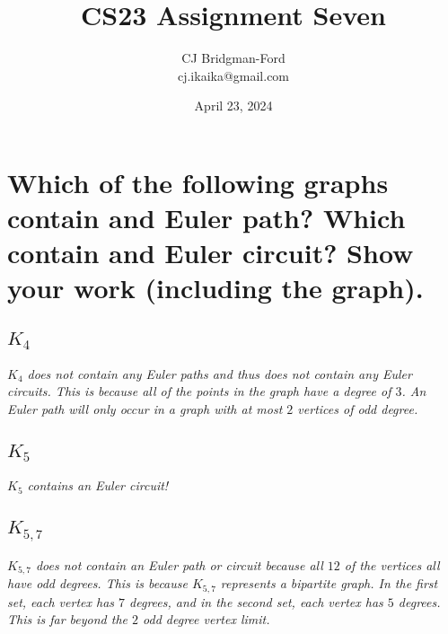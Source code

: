 \documentclass{article}
\title{CS23 Assignment Seven}
\author{CJ Bridgman-Ford \\ cj.ikaika@gmail.com}
\date{April 23, 2024}
\begin{document}
\maketitle
\thispagestyle{empty}

\clearpage


\section{Which of the following graphs contain and Euler path? Which contain and Euler circuit? Show your work (including the graph).}
\subsection{$K_4$}
\hspace{1cm}\textit{$K_4$ does not contain any Euler paths and thus does not contain any Euler circuits. This is because all of the points in the graph have a degree of $3$. An Euler path will only occur in a graph with at most $2$ vertices of odd degree.}
\subsection{$K_5$}
\begin{center}
\end{center}
\hspace{1cm}\textit{$K_5$ contains an Euler circuit!}
\subsection{$K_{5,7}$}
\hspace{1cm}\textit{$K_{5,7}$ does not contain an Euler path or circuit because all $12$ of the vertices all have odd degrees. This is because $K_{5,7}$ represents a bipartite graph. In the first set, each vertex has $7$ degrees, and in the second set, each vertex has $5$ degrees. This is far beyond the $2$ odd degree vertex limit.}
\clearpage
\end{document}
